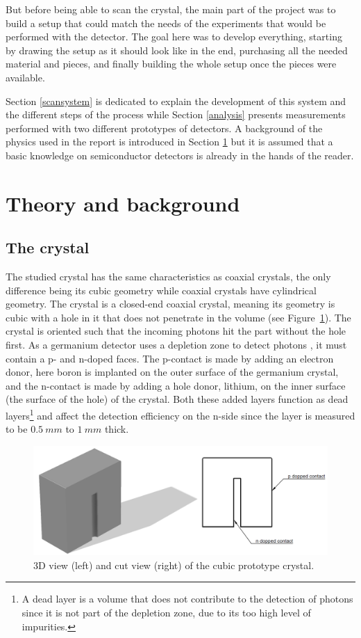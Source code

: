 \documentclass[11pt,a4paper]{article}
\begin{document}
But before being able to scan the crystal, the main part of the project was to build a setup that could match the needs of the experiments that would be performed with the detector. The goal here was to develop everything, starting by drawing the setup as it should look like in the end, purchasing all the needed material and pieces, and finally building the whole setup once the pieces were available. 

Section \ref{scansystem} is dedicated to explain the development of this system and the different steps of the process while Section \ref{analysis} presents measurements performed with two different prototypes of detectors. A background of the physics used in the report is introduced in Section \ref{theory} but it is assumed that a basic knowledge on semiconductor detectors is already in the hands of the reader.

\newpage

\section{Theory and background} \label{theory}

\subsection{The crystal}

The studied crystal has the same characteristics as coaxial crystals, the only difference being its cubic geometry while coaxial crystals have cylindrical geometry. The crystal is a closed-end coaxial crystal, meaning its geometry is cubic with a hole in it that does not penetrate in the volume (see Figure~\ref{geo}). The crystal is oriented such that the incoming photons hit the part without the hole first. As a germanium detector uses a depletion zone to detect photons \cite{phot}, it must contain a p- and n-doped faces. The p-contact is made by adding an electron donor, here boron is implanted on the outer surface of the germanium crystal, and the n-contact is made by adding a hole donor, lithium, on the inner surface (the surface of the hole) of the crystal. Both these added layers function as dead layers\footnote{A dead layer is a volume that does not contribute to the detection of photons since it is not part of the depletion zone, due to its too high level of impurities.} and affect the detection efficiency on the n-side since the layer is measured to be $0.5~mm$ to $1~mm$ thick.

\begin{figure}[!h]
\centering
\includegraphics[scale=0.4]{Crystal.png}
\caption{3D view (left) and cut view (right) of the cubic prototype crystal.}
\label{geo}
\end{figure}
\end{document}
